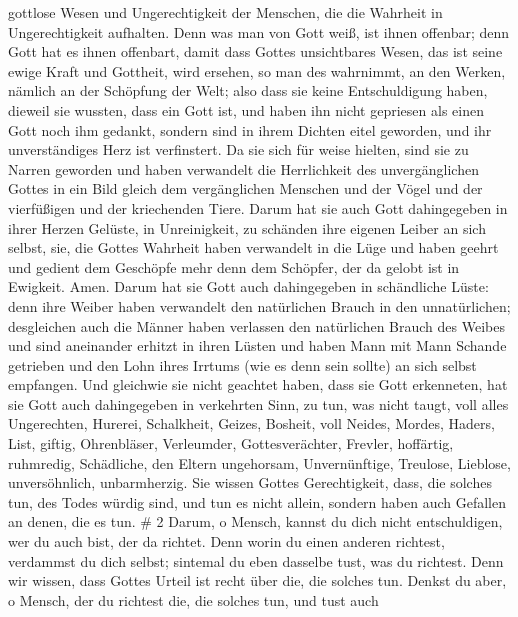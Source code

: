 gottlose Wesen und Ungerechtigkeit der Menschen, die die Wahrheit in
Ungerechtigkeit aufhalten.  Denn was man von Gott weiß, ist
ihnen offenbar; denn Gott hat es ihnen offenbart,  damit
dass Gottes unsichtbares Wesen, das ist seine ewige Kraft und Gottheit,
wird ersehen, so man des wahrnimmt, an den Werken, nämlich an der
Schöpfung der Welt; also dass sie keine Entschuldigung haben,
 dieweil sie wussten, dass ein Gott ist, und haben ihn
nicht gepriesen als einen Gott noch ihm gedankt, sondern sind in ihrem
Dichten eitel geworden, und ihr unverständiges Herz ist verfinstert.
 Da sie sich für weise hielten, sind sie zu Narren geworden
 und haben verwandelt die Herrlichkeit des unvergänglichen
Gottes in ein Bild gleich dem vergänglichen Menschen und der Vögel und
der vierfüßigen und der kriechenden Tiere.  Darum hat sie
auch Gott dahingegeben in ihrer Herzen Gelüste, in Unreinigkeit, zu
schänden ihre eigenen Leiber an sich selbst,  sie, die
Gottes Wahrheit haben verwandelt in die Lüge und haben geehrt und
gedient dem Geschöpfe mehr denn dem Schöpfer, der da gelobt ist in
Ewigkeit. Amen.  Darum hat sie Gott auch dahingegeben in
schändliche Lüste: denn ihre Weiber haben verwandelt den natürlichen
Brauch in den unnatürlichen;  desgleichen auch die Männer
haben verlassen den natürlichen Brauch des Weibes und sind aneinander
erhitzt in ihren Lüsten und haben Mann mit Mann Schande getrieben und
den Lohn ihres Irrtums (wie es denn sein sollte) an sich selbst
empfangen.  Und gleichwie sie nicht geachtet haben, dass
sie Gott erkenneten, hat sie Gott auch dahingegeben in verkehrten Sinn,
zu tun, was nicht taugt,  voll alles Ungerechten, Hurerei,
Schalkheit, Geizes, Bosheit, voll Neides, Mordes, Haders, List, giftig,
Ohrenbläser,  Verleumder, Gottesverächter, Frevler,
hoffärtig, ruhmredig, Schädliche, den Eltern ungehorsam, 
Unvernünftige, Treulose, Lieblose, unversöhnlich, unbarmherzig.
 Sie wissen Gottes Gerechtigkeit, dass, die solches tun,
des Todes würdig sind, und tun es nicht allein, sondern haben auch
Gefallen an denen, die es tun. \# 2  Darum, o Mensch, kannst
du dich nicht entschuldigen, wer du auch bist, der da richtet. Denn
worin du einen anderen richtest, verdammst du dich selbst; sintemal du
eben dasselbe tust, was du richtest.  Denn wir wissen, dass
Gottes Urteil ist recht über die, die solches tun.  Denkst
du aber, o Mensch, der du richtest die, die solches tun, und tust auch
